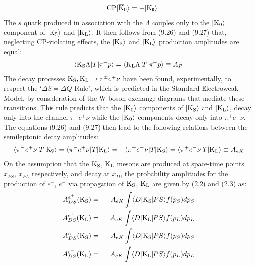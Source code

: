 \documentclass [12pt]{article}
\begin{document}
{\[   ~~~{\rm CP} |{\rm \overline{K}_0}\rangle = -|{\rm K_0}\rangle\]
    The  $\overline{s}$ quark produced in association with the $\Lambda$ couples only to the  $|{\rm K_0}\rangle$
    component of  $|{\rm K_S}\rangle$ and $|{\rm K_L}\rangle$. It then follows from (9.26) and (9.27) that, neglecting
     CP-violating effects, the  $|{\rm K_S}\rangle$ and $|{\rm K_L}\rangle$ production amplitudes are equal:
     \begin{equation}
      \langle{\rm K_S}\Lambda|T|\pi^- p \rangle =  \langle{\rm K_L}\Lambda|T|\pi^- p \rangle \equiv A_P
     \end{equation}
     The decay processes  ${\rm K_S},{\rm K_L} \rightarrow \pi^{\pm}e^{\mp} \nu$ have been found, experimentally, to 
    respect the `$\Delta S = \Delta Q$ Rule', which is predicted in the Standard Electroweak Model, by consideration
   of the W-boson exchange diagrams that mediate these transitions. This rule predicts that the  $|{\rm K_0}\rangle$
    components of  $|{\rm K_S}\rangle$ and $|{\rm K_L}\rangle$, decay only into the channel $\pi^- e^+ \nu$ while 
    the $|{\rm \overline{K}_0}\rangle$ components decay only into $\pi^+ e^- \nu$. The equations (9.26) and
     (9.27) then lead to the following relations between the semileptonic decay amplitudes:
      \begin{equation}
  \langle \pi^- e^+ \nu |T|{\rm K_S} \rangle = \langle \pi^- e^+ \nu |T|{\rm K_L} \rangle 
    = - \langle \pi^+ e^- \nu |T|{\rm K_S} \rangle =  \langle \pi^+ e^- \nu |T|{\rm K_L} \rangle \equiv A_{eK}
     \end{equation}
     On the assumption that the  ${\rm K_S}$, ${\rm K_L}$ mesons are produced at space-time points
    $x_{PS}$,  $x_{PL}$ respectively, and decay at  $x_D$, the probability amplitudes for the production
    of $e^+$, $e^-$ via propagation of ${\rm K_S}$, ${\rm K_L}$ are given by (2.2) and (2.3) as:
     \begin{eqnarray}
     A_{DS}^{e^+}({\rm K_S}) & = & A_{eK}\int \langle D |{\rm K_S}| PS  \rangle f(p_S) d p_S   \\
      A_{DS}^{e^+}({\rm K_L}) & = & A_{eK}\int \langle D |{\rm K_L}| PS  \rangle f(p_L) d p_L  \\
    A_{DS}^{e^-}({\rm K_S}) & = & - A_{eK}\int \langle D |{\rm K_S}| PS  \rangle f(p_S) d p_S   \\
       A_{DS}^{e^-}({\rm K_L}) & = & A_{eK}\int \langle D |{\rm K_L}| PS  \rangle f(p_L) d p_L  
  \end{eqnarray}

}
\end{document}
